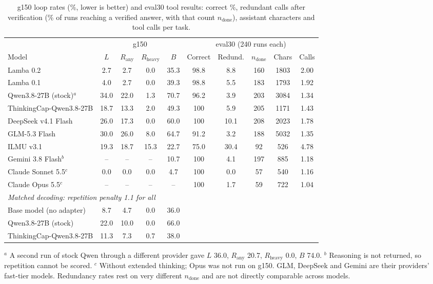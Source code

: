 \documentclass[11pt]{article}
\newcommand{\Rany}{R_{\text{any}}}
\newcommand{\Rheavy}{R_{\text{heavy}}}
\begin{document}
\begin{table}[t]
\centering
\small
\caption{g150 loop rates (\%, lower is better) and eval30 tool results: correct \%, redundant calls after verification (\% of runs reaching a verified answer, with that count $n_{\text{done}}$), assistant characters and tool calls per task.}
\label{tab:cross}
\setlength{\tabcolsep}{4.5pt}
\begin{tabular}{lcccc|ccccc}
\toprule
 & \multicolumn{4}{c|}{g150} & \multicolumn{5}{c}{eval30 (240 runs each)} \\
Model & $L$ & $\Rany$ & $\Rheavy$ & $B$ & Correct & Redund. & $n_{\text{done}}$ & Chars & Calls \\
\midrule
Lamba 0.2 & 2.7 & 2.7 & 0.0 & 35.3 & 98.8 & 8.8 & 160 & 1803 & 2.00 \\
Lamba 0.1 & 4.0 & 2.7 & 0.0 & 39.3 & 98.8 & 5.5 & 183 & 1793 & 1.92 \\
\midrule
Qwen3.8-27B (stock)$^a$ & 34.0 & 22.0 & 1.3 & 70.7 & 96.2 & 3.9 & 203 & 3084 & 1.34 \\
ThinkingCap-Qwen3.8-27B & 18.7 & 13.3 & 2.0 & 49.3 & 100 & 5.9 & 205 & 1171 & 1.43 \\
DeepSeek v4.1 Flash & 26.0 & 17.3 & 0.0 & 60.0 & 100 & 10.1 & 208 & 2023 & 1.78 \\
GLM-5.3 Flash & 30.0 & 26.0 & 8.0 & 64.7 & 91.2 & 3.2 & 188 & 5032 & 1.35 \\
ILMU v3.1 & 19.3 & 18.7 & 15.3 & 22.7 & 75.0 & 30.4 & 92 & 526 & 4.78 \\
Gemini 3.8 Flash$^b$ & -- & -- & -- & 10.7 & 100 & 4.1 & 197 & 885 & 1.18 \\
Claude Sonnet 5.5$^c$ & 0.0 & 0.0 & 0.0 & 4.7 & 100 & 0.0 & 57 & 540 & 1.16 \\
Claude Opus 5.5$^c$ & -- & -- & -- & -- & 100 & 1.7 & 59 & 722 & 1.04 \\
\midrule
\multicolumn{10}{l}{\emph{Matched decoding: repetition penalty 1.1 for all}} \\
Base model (no adapter) & 8.7 & 4.7 & 0.0 & 36.0 & & & & & \\
Qwen3.8-27B (stock) & 22.0 & 10.0 & 0.0 & 66.0 & & & & & \\
ThinkingCap-Qwen3.8-27B & 11.3 & 7.3 & 0.7 & 38.0 & & & & & \\
\bottomrule
\end{tabular}

\smallskip
\footnotesize $^a$ A second run of stock Qwen through a different provider gave $L$ 36.0, $\Rany$ 20.7, $\Rheavy$ 0.0, $B$ 74.0. $^b$ Reasoning is not returned, so repetition cannot be scored. $^c$ Without extended thinking; Opus was not run on g150. GLM, DeepSeek and Gemini are their providers' fast-tier models. Redundancy rates rest on very different $n_{\text{done}}$ and are not directly comparable across models.
\end{table}
\end{document}
